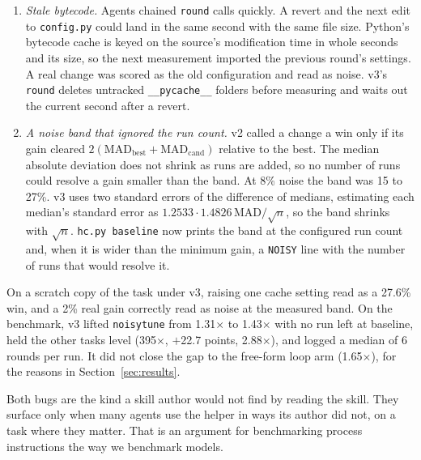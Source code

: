 \begin{enumerate}
\item \emph{Stale bytecode.} Agents chained \texttt{round} calls quickly. A revert and the next edit to
  \texttt{config.py} could land in the same second with the same file size. Python's bytecode cache is keyed on
  the source's modification time in whole seconds and its size, so the next measurement imported the previous
  round's settings. A real change was scored as the old configuration and read as noise. v3's \texttt{round}
  deletes untracked \texttt{\_\_pycache\_\_} folders before measuring and waits out the current second after a
  revert.
\item \emph{A noise band that ignored the run count.} v2 called a change a win only if its gain cleared
  $2(\mathrm{MAD}_{\text{best}} + \mathrm{MAD}_{\text{cand}})$ relative to the best. The median absolute deviation
  does not shrink as runs are added, so no number of runs could resolve a gain smaller than the band. At 8\% noise
  the band was 15 to 27\%. v3 uses two standard errors of the
  difference of medians, estimating each median's standard error as $1.2533 \cdot 1.4826\,\mathrm{MAD}/\sqrt{n}$,
  so the band shrinks with $\sqrt{n}$. \texttt{hc.py baseline} now prints the band at the configured run count
  and, when it is wider than the minimum gain, a \texttt{NOISY} line with the number of runs that would resolve
  it.
\end{enumerate}

On a scratch copy of the task under v3, raising one cache setting read as a 27.6\% win, and a 2\% real gain
correctly read as noise at the measured band. On the benchmark, v3 lifted \texttt{noisytune} from
1.31$\times$ to 1.43$\times$ with no run left at baseline, held the other tasks level (395$\times$, $+$22.7
points, 2.88$\times$), and logged a median of 6 rounds per run. It did not close the gap to the free-form
\textsf{loop} arm (1.65$\times$), for the reasons in Section~\ref{sec:results}.

Both bugs are the kind a skill author would not find by reading the skill. They surface only when many agents
use the helper in ways its author did not, on a task where they matter. That is an argument for benchmarking
process instructions the way we benchmark models.

